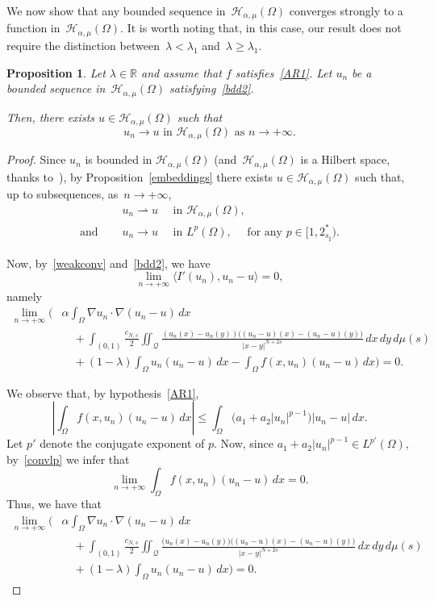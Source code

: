 \documentclass[12pt,a4paper,intlimits,sumlimits]{amsart}
\def \R {\mathbb{R}}
\def \Q {\mathcal Q}
\theoremstyle{definition}
\theoremstyle{plain}
\newtheorem{proposition}[definition]{Proposition}
\numberwithin{equation}{section}
\renewcommand{\le}{\leqslant}
\renewcommand{\ge}{\geqslant}
\begin{document}
We now show that any bounded sequence in~$\mathcal{H}_{\alpha, \mu}(\Omega)$ converges strongly to a function in~$\mathcal{H}_{\alpha, \mu}(\Omega)$. It is worth noting that, in this case, our result does not require the distinction between~$\lambda<\lambda_1$ and~$\lambda\ge\lambda_1$.

\begin{proposition}\label{PropPS2}
Let $\lambda\in\R$ and assume that $f$ satisfies~\eqref{AR1}. Let $u_n$ be a bounded sequence in~$\mathcal{H}_{\alpha, \mu}(\Omega)$ satisfying~\eqref{bdd2}.

Then, there exists $u\in\mathcal{H}_{\alpha, \mu}(\Omega)$ such that
\[
{\mbox{$u_n\to u$ in~$\mathcal{H}_{\alpha, \mu}(\Omega)$ as~$n\to+\infty$.}}
\]
\end{proposition}

\begin{proof}
Since $u_n$ is bounded in $ \mathcal{H}_{\alpha, \mu}(\Omega)$
(and~$ \mathcal{H}_{\alpha, \mu}(\Omega)$ is a Hilbert space, thanks
to~\cite[Corollary~2.2]{TUTTI}), by Proposition~\ref{embeddings} there exists $u\in\mathcal{H}_{\alpha, \mu}(\Omega)$ such that, up to subsequences, as~$n\to+\infty$,
\begin{align}\label{weakconv}
&u_n\rightharpoonup u \quad\mbox{ in }  \mathcal{H}_{\alpha, \mu}(\Omega),\\ \label{convlp}
{\mbox{and }} \quad &u_n\to u \quad\mbox{ in }  L^p(\Omega), \quad\mbox{ for any } p\in [1, 2^*_{s_\sharp}).
\end{align}

Now, by~\eqref{weakconv} and~\eqref{bdd2}, we have
\[
\lim_{n\to +\infty}\langle I'(u_n), u_n -u\rangle = 0,
\]
namely
\[
\begin{split}
\lim_{n\to +\infty}\Bigg(&\alpha \int_\Omega \nabla u_n\cdot\nabla (u_n-u) \, dx\\
&\quad+\int_{(0, 1)} \frac{c_{N, s}}{2} \iint_{\Q} \frac{(u_n(x)-u_n(y))\big((u_n-u)(x)-(u_n-u)(y)\big)}{|x-y|^{N+2s}} \,dx\,dy\, d\mu(s)\\
&\quad+(1-\lambda)\int_\Omega u_n(u_n-u)\, dx -\int_\Omega f(x, u_n) (u_n-u) \, dx\Bigg)=0.
\end{split}
\]

We observe that, by hypothesis~\eqref{AR1}, 
\[
\left|\int_\Omega f(x, u_n) (u_n-u) \, dx\right|\le \int_\Omega \big(
a_1 +a_2 |u_n|^{p-1}\big) |u_n - u| \, dx.
\]
Let $p'$ denote the conjugate exponent of $p$. Now, since $a_1 +a_2 |u_n|^{p-1} \in L^{p'}(\Omega)$, by~\eqref{convlp} we infer that
\[
\lim_{n\to +\infty} \int_\Omega f(x, u_n) (u_n-u) \, dx =0.
\]
Thus, we have that
\begin{equation}\label{lim1}
\begin{split}
\lim_{n\to +\infty}\Bigg(&\alpha \int_\Omega \nabla u_n\cdot\nabla (u_n-u) \, dx\\
&\quad+\int_{(0, 1)} \frac{c_{N, s}}{2} \iint_{\Q} \frac{\big(u_n(x)-u_n(y))((u_n-u)(x)-(u_n-u)(y)\big)}{|x-y|^{N+2s}} \,dx\,dy\, d\mu(s)\\
&\quad+(1-\lambda)\int_\Omega u_n(u_n-u)\, dx\Bigg)=0.
\end{split}
\end{equation}


\end{proof}
\end{document}
